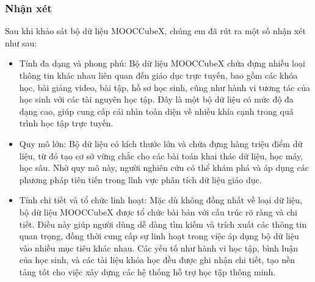 \subsubsection{Nhận xét}
Sau khi khảo sát bộ dữ liệu MOOCCubeX, chúng em đã rút ra một số nhận xét như sau:
\begin{itemize}
    \item Tính đa dạng và phong phú: Bộ dữ liệu MOOCCubeX chứa đựng nhiều loại thông tin khác nhau liên quan đến giáo dục trực tuyến, bao gồm các khóa học, bài giảng video, bài tập, hồ sơ học sinh, cũng như hành vi tương tác của học sinh với các tài nguyên học tập. Đây là một bộ dữ liệu có mức độ đa dạng cao, giúp cung cấp cái nhìn toàn diện về nhiều khía cạnh trong quá trình học tập trực tuyến.
    \item Quy mô lớn: Bộ dữ liệu có kích thước lớn và chứa đựng hàng triệu điểm dữ liệu, từ đó tạo cơ sở vững chắc cho các bài toán khai thác dữ liệu, học máy, học sâu. Nhờ quy mô này, người nghiên cứu có thể khám phá và áp dụng các phương pháp tiên tiến trong lĩnh vực phân tích dữ liệu giáo dục.
    \item Tính chi tiết và tổ chức linh hoạt: Mặc dù không đồng nhất về loại dữ liệu, bộ dữ liệu MOOCCubeX được tổ chức bài bản với cấu trúc rõ ràng và chi tiết. Điều này giúp người dùng dễ dàng tìm kiếm và trích xuất các thông tin quan trọng, đồng thời cung cấp sự linh hoạt trong việc áp dụng bộ dữ liệu vào nhiều mục tiêu khác nhau. Các yếu tố như hành vi học tập, bình luận của học sinh, và các tài liệu khóa học đều được ghi nhận chi tiết, tạo nền tảng tốt cho việc xây dựng các hệ thống hỗ trợ học tập thông minh.
\end{itemize}
